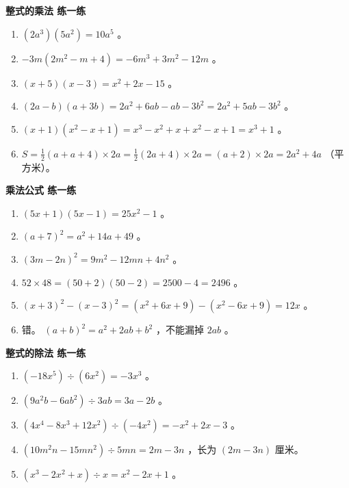 \begin{answer}
\textbf{整式的乘法 练一练}

\begin{enumerate}
  \item $(2a^3)(5a^2) = 10a^5$ 。
  \item $-3m(2m^2 - m + 4) = -6m^3 + 3m^2 - 12m$ 。
  \item $(x + 5)(x - 3) = x^2 + 2x - 15$ 。
  \item $(2a - b)(a + 3b) = 2a^2 + 6ab - ab - 3b^2 = 2a^2 + 5ab - 3b^2$ 。
  \item $(x + 1)(x^2 - x + 1) = x^3 - x^2 + x + x^2 - x + 1 = x^3 + 1$ 。
  \item $S = \frac{1}{2}(a + a + 4) \times 2a = \frac{1}{2}(2a + 4) \times 2a = (a + 2) \times 2a = 2a^2 + 4a$ （平方米）。
\end{enumerate}


\textbf{乘法公式 练一练}

\begin{enumerate}
  \item $(5x + 1)(5x - 1) = 25x^2 - 1$ 。
  \item $(a + 7)^2 = a^2 + 14a + 49$ 。
  \item $(3m - 2n)^2 = 9m^2 - 12mn + 4n^2$ 。
  \item $52 \times 48 = (50 + 2)(50 - 2) = 2500 - 4 = 2496$ 。
  \item $(x + 3)^2 - (x - 3)^2 = (x^2 + 6x + 9) - (x^2 - 6x + 9) = 12x$ 。
  \item 错。 $(a + b)^2 = a^2 + 2ab + b^2$ ，不能漏掉 $2ab$ 。
\end{enumerate}


\textbf{整式的除法 练一练}

\begin{enumerate}
  \item $(-18x^5) \div (6x^2) = -3x^3$ 。
  \item $(9a^2b - 6ab^2) \div 3ab = 3a - 2b$ 。
  \item $(4x^4 - 8x^3 + 12x^2) \div (-4x^2) = -x^2 + 2x - 3$ 。
  \item $(10m^2n - 15mn^2) \div 5mn = 2m - 3n$ ，长为 $(2m - 3n)$ 厘米。
  \item $(x^3 - 2x^2 + x) \div x = x^2 - 2x + 1$ 。
\end{enumerate}


\end{answer}
